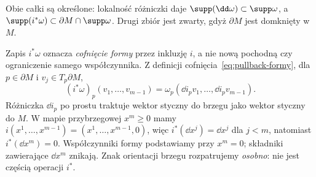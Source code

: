 Obie całki są określone: lokalność różniczki daje
$\supp(\dd\omega)\subset\supp\omega$, a
$\supp(i^*\omega)\subset\partial M\cap\supp\omega$.
Drugi zbiór jest zwarty, gdyż $\partial M$ jest domknięty w $M$.

Zapis $i^*\omega$ oznacza \emph{cofnięcie formy}
przez inkluzję $i$, a nie nową pochodną czy
ograniczenie samego współczynnika. Z definicji
cofnięcia~\eqref{eq:pullback-formy}, dla
$p\in\partial M$ i $v_j\in T_p\partial M$,
\begin{equation}\label{eq:inkluzja-formy}
 (i^*\omega)_p(v_1,\ldots,v_{m-1})
 =\omega_p(\dd i_pv_1,\ldots,\dd i_pv_{m-1}).
\end{equation}
Różniczka $\dd i_p$ po prostu traktuje wektor
styczny do brzegu jako wektor styczny do $M$.
W mapie przybrzegowej $x^m\geq0$ mamy
$i(x^1,\ldots,x^{m-1})=(x^1,\ldots,x^{m-1},0)$,
więc $i^*(\dd x^j)=\dd x^j$ dla $j<m$, natomiast
$i^*(\dd x^m)=0$. Współczynniki formy podstawiamy
przy $x^m=0$; składniki zawierające $\dd x^m$
znikają. Znak orientacji brzegu rozpatrujemy
\emph{osobno}: nie jest częścią operacji $i^*$.

